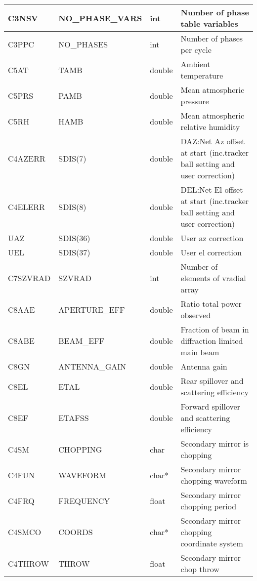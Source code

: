 \documentclass[twoside,11pt,nolof]{starlink}
\begin{document}
\begin {longtable}{|p{38mm}|p{42mm}|p{11mm}|p{55mm}|}
\hline \label{GSDVars:nPhaseVars}C3NSV & NO\_PHASE\_VARS & int & Number of phase table variables\\
\hline \label{GSDVars:nPhases}C3PPC & NO\_PHASES & int & Number of phases per cycle\\
\hline \label{GSDVars:tamb}C5AT & TAMB & double & Ambient temperature\\
\hline \label{GSDVars:pamb}C5PRS & PAMB & double & Mean atmospheric pressure\\
\hline \label{GSDVars:hamb}C5RH & HAMB & double & Mean atmospheric relative humidity\\
\hline \label{GSDVars:errAz}C4AZERR & SDIS(7) & double & DAZ:Net Az offset at start (inc.tracker ball setting and user correction)\\
\hline \label{GSDVars:errEl}C4ELERR & SDIS(8) & double & DEL:Net El offset at start (inc.tracker ball setting and user correction)\\
\hline \label{GSDVars:userAz}UAZ & SDIS(36) & double & User az correction\\
\hline \label{GSDVars:userEl}UEL & SDIS(37) & double & User el correction\\
\hline \label{GSDVars:nVRad}C7SZVRAD & SZVRAD & int & Number of elements of vradial array\\
\hline \label{GSDVars:apertureEff}C8AAE & APERTURE\_EFF & double & Ratio total power observed\\
\hline \label{GSDVars:beamEff}C8ABE & BEAM\_EFF & double & Fraction of beam in diffraction limited main beam\\
\hline \label{GSDVars:antennaGain}C8GN & ANTENNA\_GAIN & double & Antenna gain\\
\hline \label{GSDVars:etal}C8EL & ETAL & double & Rear spillover and scattering efficiency\\
\hline \label{GSDVars:etafss}C8EF & ETAFSS & double & Forward spillover and scattering efficiency\\
\hline \label{GSDVars:chopping}C4SM & CHOPPING & char & Secondary mirror is chopping\\
\hline \label{GSDVars:chopWaveform}C4FUN & WAVEFORM & char* & Secondary mirror chopping waveform\\
\hline \label{GSDVars:chopFrequency}C4FRQ & FREQUENCY & float & Secondary mirror chopping period\\
\hline \label{GSDVars:chopCoords}C4SMCO & COORDS & char* & Secondary mirror chopping coordinate system\\
\hline \label{GSDVars:chopThrow}C4THROW & THROW & float & Secondary mirror chop throw\\

\end{longtable}
\end{document}
